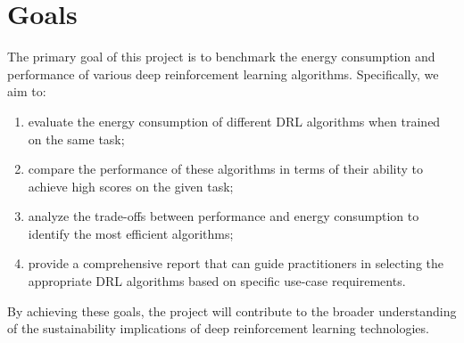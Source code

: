 \section{Goals}
\label{sec:goals}
The primary goal of this project is to benchmark the energy consumption and performance of various deep reinforcement learning algorithms. Specifically, we aim to:

\begin{enumerate}
	\item evaluate the energy consumption of different DRL algorithms when trained on the same task;
	\item compare the performance of these algorithms in terms of their ability to achieve high scores on the given task;
	\item analyze the trade-offs between performance and energy consumption to identify the most efficient algorithms;
	\item provide a comprehensive report that can guide practitioners in selecting the appropriate DRL algorithms based on specific use-case requirements.
\end{enumerate}

By achieving these goals, the project will contribute to the broader understanding of the sustainability implications of deep reinforcement learning technologies.
